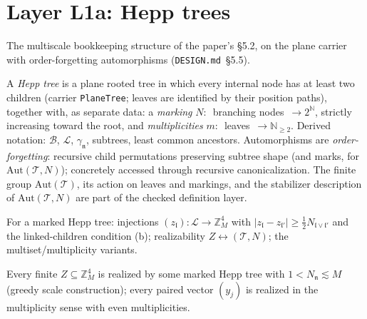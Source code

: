 \chapter{Layer L1a: Hepp trees}\label{ch:hepp}

The multiscale bookkeeping structure of the paper's \S5.2, on the plane
carrier with order-forgetting automorphisms
(\texttt{DESIGN.md}~\S5.5).

\begin{definition}\label{D-hepp}
  \leanok
  A \emph{Hepp tree} is a plane rooted tree in which every internal node
  has at least two children (carrier \texttt{PlaneTree}; leaves are
  identified by their position paths), together with, as separate data:
  a \emph{marking} \(N\colon\)~branching nodes~\(\to 2^{\mathbb{N}}\),
  strictly increasing toward the root, and \emph{multiplicities}
  \(m\colon\)~leaves~\(\to \mathbb{N}_{\ge 2}\). Derived notation:
  \(\mathcal{B}\), \(\mathcal{L}\), \(\gamma_{\mathfrak n}\), subtrees,
  least common ancestors. Automorphisms are \emph{order-forgetting}:
  recursive child permutations preserving subtree shape (and marks, for
  \(\mathrm{Aut}(\mathcal{T},N)\)); concretely accessed through recursive
  canonicalization. The finite group \(\mathrm{Aut}(\mathcal{T})\), its
  action on leaves and markings, and the stabilizer description of
  \(\mathrm{Aut}(\mathcal{T},N)\) are part of the checked definition layer.
\end{definition}

\begin{definition}\label{D-adm}
  \leanok
  For a marked Hepp tree: injections \((z_{\mathfrak l})\colon
  \mathcal{L} \to \mathbb{Z}^4_M\) with
  \(\lvert z_{\mathfrak l} - z_{{\mathfrak l}'}\rvert \ge
  \tfrac12 N_{{\mathfrak l}\vee{\mathfrak l}'}\) and the linked-children
  condition (b); realizability \(Z \leftrightarrow (\mathcal{T}, N)\);
  the multiset/multiplicity variants.
\end{definition}

\begin{lemma}\label{L-5.5}
  \leanok
  Every finite \(Z \subseteq \mathbb{Z}^4_M\) is realized by some marked
  Hepp tree with \(1 < N_{\mathfrak n} \lesssim M\) (greedy scale
  construction); every paired vector \((y_j)\) is realized in the
  multiplicity sense with even multiplicities.
\end{lemma}

